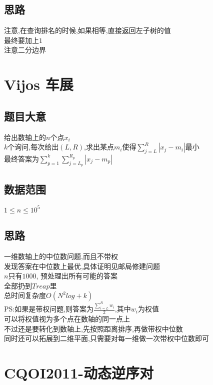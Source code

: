 \documentclass{ctexart}
\numberwithin{equation}{section}
\begin{document}
\begin{flushleft}
  \subsection{思路}
  注意,在查询排名的时候,如果相等,直接返回左子树的值\\
  最终要加上$1$\\
  注意二分边界\\
  \newpage

  \section{Vijos 车展}
  \subsection{题目大意}
  给出数轴上的$n$个点$x_i$\\
  $k$个询问,每次给出$(L,R)$,求出某点$m_i$使得$\sum_{j=L}^R |x_j-m_i|$最小\\
  最终答案为$\sum_{p=1}^k\sum_{j=L_p}^{R_p}|x_j-m_p|$\\
  \subsection{数据范围}
  $1\le n\le 10^5$\\
  \subsection{思路}
  一维数轴上的中位数问题,而且不带权\\
  发现答案在中位数上最优,具体证明见邮局修建问题\\

  $n$只有$1000$, 预处理出所有可能的答案\\
  全部扔到$Treap$里\\
  总时间复杂度$O(N^2log+k)$\\

  PS:如果是带权问题,则答案为$\frac{\sum_{i=L}^Rw_i}{2}$,其中$w_i$为权值\\
  可以将权值视为多个点在数轴的同一点上\\
  不过还是要转化到数轴上,先按照距离排序,再做带权中位数\\
  同时还可以拓展到二维平面,只需要对每一维做一次带权中位数即可\\
  \newpage

  \section{CQOI2011-动态逆序对}

\end{flushleft}
\end{document}
